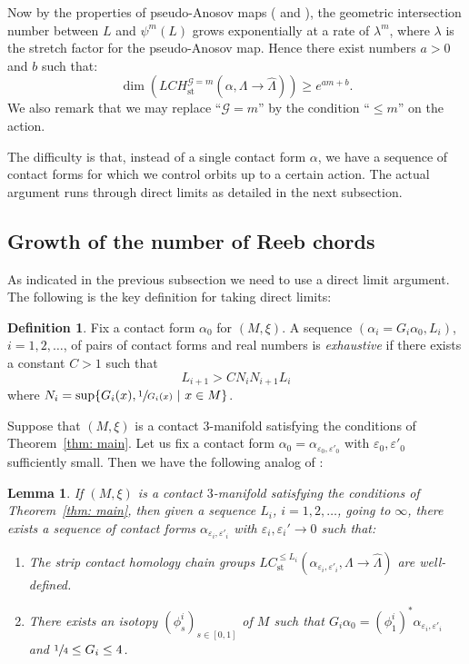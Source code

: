 \documentclass[JEP,XML,SOM,Unicode,NoFloatCountersInSection]{cedram}
\let\mathcal\mathscr
\let\ra\rightarrow
\newcommand{\st}{\mathrm{st}}
\theoremstyle{plain}
\newtheorem{lemma}[thm]{Lemma}
\theoremstyle{definition}
\newtheorem{defn}[thm]{Definition}
\numberwithin{equation}{subsection}
\newcommand{\be}{\begin{enumerate}}
\newcommand{\ee}{\end{enumerate}}
\begin{document}
Now by the properties of pseudo-Anosov maps (\cf \cite{FLP} and \cite[Th.\,14.24]{FM}), the geometric intersection number between $L$ and $\psi^m(L)$ grows exponentially at a rate of $\lambda^m$, where $\lambda$ is the stretch factor for the pseudo-Anosov map. Hence there exist numbers $a>0$ and $b$ such that:
\begin{equation} \label{eqn: exp growth}
\dim(LCH_{\st}^{\mathcal{G}=m}(\alpha,\Lambda\ra \widehat{\Lambda}))\geq e^{am+b}.
\end{equation}
We also remark that we may replace ``$\mathcal{G}=m$'' by the condition ``$\leq m$'' on the action.

The difficulty is that, instead of a single contact form $\alpha$, we have a sequence of contact forms for which we control orbits up to a certain action. The actual argument runs through direct limits as detailed in the next subsection.

\subsection{Growth of the number of Reeb chords}

As indicated in the previous subsection we need to use a direct limit argument. The following is the key definition for taking direct limits:

\begin{defn} \label{defn: exhaustive}
Fix a contact form $\alpha_0$ for $(M,\xi)$.
A sequence $(\alpha_i=G_i\alpha_0, L_i)$, $i=1,2,\dots$, of pairs of contact forms and real numbers is {\em exhaustive} if there exists a constant $C>1$ such that
\begin{equation} \label{eqn: exhaustive condition}
L_{i+1}> CN_i N_{i+1}L_i
\end{equation}
where $N_i=\sup \{ G_i(x), \sfrac{1}{G_i(x)}~|~ x\in M\}$.
\end{defn}

Suppose that $(M,\xi)$ is a contact $3$-manifold satisfying the conditions of Theorem~\ref{thm: main}.
Let us fix a contact form $\alpha_0=\alpha_{\varepsilon_0 ,\varepsilon'_0}$ with $\varepsilon_0,\varepsilon'_0$ sufficiently small. Then we have the following analog of \cite[Prop.\,10.2]{CH2}:

\begin{lemma} \label{lemma: sequence of contact forms}
If $(M,\xi)$ is a contact $3$-manifold satisfying the conditions of Theorem~\ref{thm: main}, then given a sequence $L_i$, $i=1,2,\dots$, going to $\infty$, there exists a sequence of contact forms $\alpha_{\varepsilon_i,\varepsilon'_i}$ with $\varepsilon_i,\varepsilon_i'\to 0$ such that:
\be
\item The strip contact homology chain groups $LC_{\st}^{\leq L_i}(\alpha_{\varepsilon_i,\varepsilon'_i}, \Lambda\ra \widehat\Lambda)$ are well-defined.
\item There exists an isotopy $(\phi^i_s)_{s\in[0,1]}$ of $M$ such that $G_i \alpha_0 = (\phi^i_1)^* \alpha_{\varepsilon_i,\varepsilon'_i}$
and $\sfrac{1}{4} \leq G_i \leq 4$.
\ee
\end{lemma}
\end{document}
